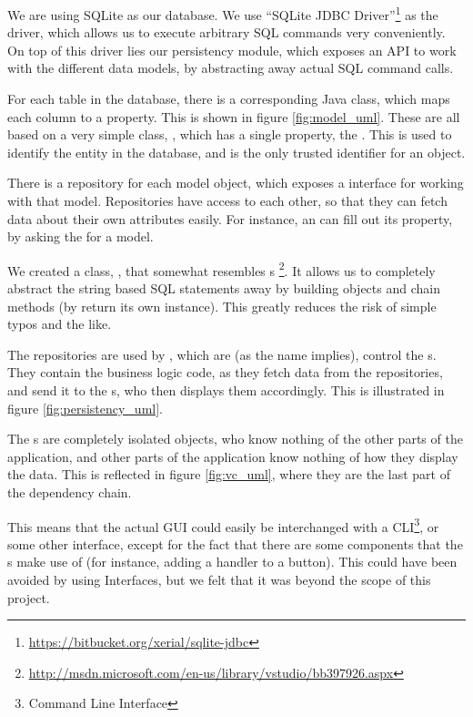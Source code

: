 We are using SQLite as our database. We use ``SQLite JDBC Driver''\footnote{\url{https://bitbucket.org/xerial/sqlite-jdbc}} as the driver, which allows us to execute arbitrary SQL commands very conveniently. On top of this driver lies our persistency module, which exposes an API to work with the different data models, by abstracting away actual SQL command calls.

For each table in the database, there is a corresponding Java class, which maps each column to a property. This is shown in figure \ref{fig:model_uml}. These are all based on a very simple class, , which has a single property, the . This is used to identify the entity in the database, and is the only trusted identifier for an object. 

There is a repository for each model object, which exposes a  interface for working with that model. Repositories have access to each other, so that they can fetch data about their own attributes easily. For instance, an  can fill out its  property, by asking the  for a  model.

We created a class, , that somewhat resembles s \footnote{\url{http://msdn.microsoft.com/en-us/library/vstudio/bb397926.aspx}}. It allows us to completely abstract the string based SQL statements away by building  objects and chain methods (by return its own instance). This greatly reduces the risk of simple typos and the like.

The repositories are used by , which are (as the name implies), control the s. They contain the business logic code, as they fetch data from the repositories, and send it to the s, who then displays them accordingly. This is illustrated in figure \ref{fig:persistency_uml}.

The s are completely isolated objects, who know nothing of the other parts of the application, and other parts of the application know nothing of how they display the data. This is reflected in figure \ref{fig:vc_uml}, where they are the last part of the dependency chain.

This means that the actual GUI could easily be interchanged with a CLI\footnote{Command Line Interface}, or some other interface, except for the fact that there are some  components that the s make use of (for instance, adding a handler to a button). This could have been avoided by using Interfaces, but we felt that it was beyond the scope of this project.